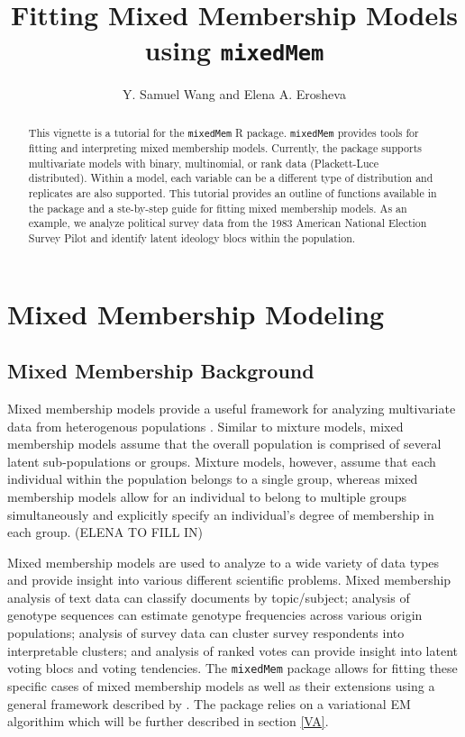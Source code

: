 \documentclass{article}\usepackage[]{graphicx}\usepackage[]{color}
\begin{document}
\title{Fitting Mixed Membership Models using \texttt{mixedMem}}
\author{Y. Samuel Wang and Elena A. Erosheva}
\maketitle

\small
\begin{abstract}
This vignette is a tutorial for the \texttt{mixedMem} R package. \texttt{mixedMem} provides tools for fitting and interpreting mixed membership models. Currently, the package supports multivariate models with binary, multinomial, or rank data (Plackett-Luce distributed). Within a model, each variable can be a different type of distribution and replicates are also supported. This tutorial provides an outline of functions available in the package and a ste-by-step guide for fitting mixed membership models. As an example, we analyze political survey data from the 1983 American National Election Survey Pilot and identify latent ideology blocs within the population.  
\end{abstract}

\normalsize
\section{Mixed Membership Modeling}
\subsection{Mixed Membership Background}
Mixed membership models provide a useful framework for analyzing multivariate data from heterogenous populations \citep{Airoldi2014Handbook}. Similar to mixture models, mixed membership models assume that the overall population is comprised of several latent sub-populations or groups. Mixture models, however, assume that each individual within the population belongs to a single group, whereas mixed membership models allow for an individual to belong to multiple groups simultaneously and explicitly specify an individual's degree of membership in each group. (ELENA TO FILL IN)

Mixed membership models are used to analyze to a wide variety of data types and provide insight into various different scientific problems. Mixed membership analysis of text data \citep{LDA, erosheva2004mixed} can classify documents by topic/subject; analysis of genotype sequences \citep{pritchard2000inference} can estimate genotype frequencies across various origin populations; analysis of survey data \citep{erosheva2007describing, grossManriqueVallier} can cluster survey respondents into interpretable clusters; and analysis of ranked votes \citep{gormley2009grade} can provide insight into latent voting blocs and voting tendencies. The \texttt{mixedMem} package allows for fitting these specific cases of mixed membership models as well as their extensions using a general framework described by \cite{erosheva2004mixed}. The package relies on a variational EM algorithim which will be further described in section \ref{VA}.
\end{document}
